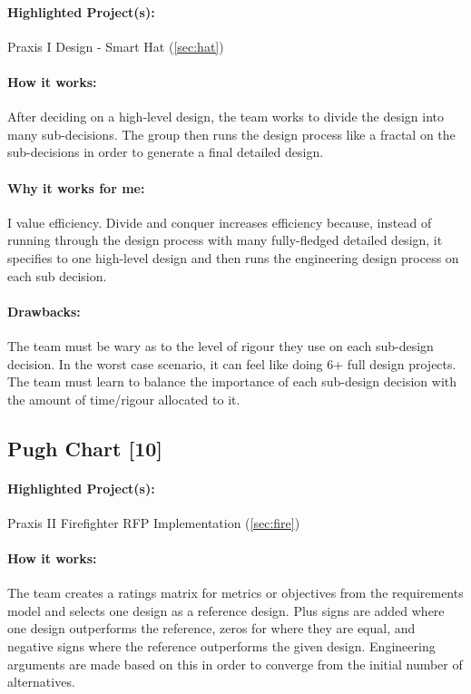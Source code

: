 \documentclass[a4paper,12pt]{article}
\begin{document}
\paragraph{Highlighted Project(s): } Praxis I Design - Smart Hat (\ref{sec:hat})
\paragraph{How it works: }
After deciding on a high-level design, the team works to divide the design into many sub-decisions. The group then runs the design process like a fractal on the sub-decisions in order to generate a final detailed design.

\paragraph{Why it works for me: }
I value efficiency. Divide and conquer increases efficiency because, instead of running through the design process with many fully-fledged detailed design, it specifies to one high-level design and then runs the engineering design process on each sub decision.

\paragraph{Drawbacks: }
The team must be wary as to the level of rigour they use on each sub-design decision. In the worst case scenario, it can feel like doing 6+ full design projects. The team must learn to balance the importance of each sub-design decision with the amount of time/rigour allocated to it.

\subsection{Pugh Chart [10]}
\label{sec:pugh}
\paragraph{Highlighted Project(s): } Praxis II Firefighter RFP Implementation (\ref{sec:fire})
\paragraph{How it works: }
The team creates a ratings matrix for metrics or objectives from the requirements model and selects one design as a reference design. Plus signs are added where one design outperforms the reference, zeros for where they are equal, and negative signs where the reference outperforms the given design. Engineering arguments are made based on this in order to converge from the initial number of alternatives.
\end{document}
